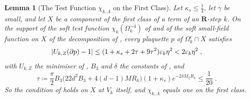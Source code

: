 \documentclass[11pt]{preprint}
\DeclarePairedDelimiter{\abs}{\lvert}{\rvert}
\numberwithin{equation}{section}
\newtheorem{lemma}{Lemma}[section]
\theoremstyle{definition}
\theoremstyle{remark}
\theoremstyle{plain}
\begin{document}
\begin{lemma}[The Test Function $\chi_{k,\Lambda}$ on the First Class]\label{lem:chi-k-lambda}
Let $\kappa_s \leq \frac14$, let $\gamma$ be small, and let $X$ be a component of the first class of a term of an $\mathbf R$-step $k$. On the support of the soft test function $\chi_k(\Omega_k^{\sim4})$ of \cite[(1.71)]{BalabanLFR1} and of the soft small-field function on $X$ of the decomposition of \cite[p.~378, l.~6]{BalabanLFR2}, every plaquette $p$ of $\Omega_k^c \cap X$ satisfies
\begin{equation}\label{eq:first-class-plaquettes}
    \abs{U_{k,Z}(\partial p) - 1} \leq (1 + \kappa_s + 2\tau + 9\tau^2)\varepsilon_k\eta^2 < 2\varepsilon_k\eta^2\;,
\end{equation}
with $U_{k,Z}$ the minimiser of \cite[(1.74)]{BalabanLFR1}, $B_3$ and $\delta$ the constants of \cite[(3.7), p.~266]{BalabanCRE}, and
\begin{equation}\label{eq:first-class-tau}
    \tau \coloneqq \frac\pi2B_3\bigl(22d^2B_3 + 4(d - 1)MR_k\bigr)(1 + \kappa_s)e^{-2\delta M_2R_k} \leq \frac1{20}\;.
\end{equation}
So the condition of \cite[(1.75), p.~193]{BalabanLFR1} holds on $X$ at $V_k$ itself, and $\chi_{k,\Lambda}$ equals one on the first class.
\end{lemma}
\end{document}
